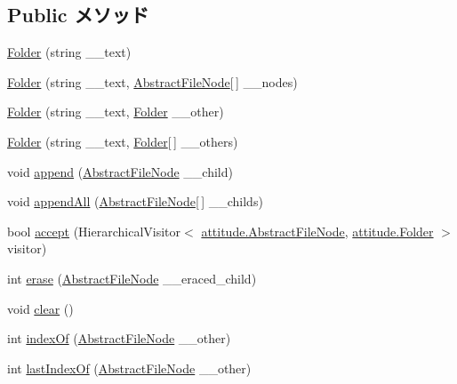 \subsection*{Public メソッド}
\begin{DoxyCompactItemize}
\item 
\hyperlink{classlazurite_1_1attitude_1_1_folder_a2f719c608e0aa3b6d36c40d31b167e79}{Folder} (string \_\-\_\-text)
\item 
\hyperlink{classlazurite_1_1attitude_1_1_folder_a5a7781a599e70e8c137cede1357b5ea1}{Folder} (string \_\-\_\-text, \hyperlink{classlazurite_1_1attitude_1_1_abstract_file_node}{AbstractFileNode}\mbox{[}$\,$\mbox{]} \_\-\_\-nodes)
\item 
\hyperlink{classlazurite_1_1attitude_1_1_folder_a06d32f03805baad6c1801dcb1985dea4}{Folder} (string \_\-\_\-text, \hyperlink{classlazurite_1_1attitude_1_1_folder}{Folder} \_\-\_\-other)
\item 
\hyperlink{classlazurite_1_1attitude_1_1_folder_a969647ad9d017d51b39728e301edb718}{Folder} (string \_\-\_\-text, \hyperlink{classlazurite_1_1attitude_1_1_folder}{Folder}\mbox{[}$\,$\mbox{]} \_\-\_\-others)
\item 
void \hyperlink{classlazurite_1_1attitude_1_1_folder_a2d16b4f30cbb594952277aeeee0c753b}{append} (\hyperlink{classlazurite_1_1attitude_1_1_abstract_file_node}{AbstractFileNode} \_\-\_\-child)
\item 
void \hyperlink{classlazurite_1_1attitude_1_1_folder_aae7705d67896ad15ad4be9d86b865d9e}{appendAll} (\hyperlink{classlazurite_1_1attitude_1_1_abstract_file_node}{AbstractFileNode}\mbox{[}$\,$\mbox{]} \_\-\_\-childs)
\item 
bool \hyperlink{classlazurite_1_1attitude_1_1_folder_ade81cb2a61c31230f4436781a7882e7a}{accept} (HierarchicalVisitor$<$ \hyperlink{classlazurite_1_1attitude_1_1_abstract_file_node}{attitude.AbstractFileNode}, \hyperlink{classlazurite_1_1attitude_1_1_folder}{attitude.Folder} $>$ visitor)
\item 
int \hyperlink{classlazurite_1_1attitude_1_1_folder_a49d1fc292192cb1d688c0e6a9ec0cb9b}{erase} (\hyperlink{classlazurite_1_1attitude_1_1_abstract_file_node}{AbstractFileNode} \_\-\_\-eraced\_\-child)
\item 
void \hyperlink{classlazurite_1_1attitude_1_1_folder_abdf37e15da03cd3b6507f445f115ff30}{clear} ()
\item 
int \hyperlink{classlazurite_1_1attitude_1_1_folder_a21d564936cd21a6e23d02bfb135b76f8}{indexOf} (\hyperlink{classlazurite_1_1attitude_1_1_abstract_file_node}{AbstractFileNode} \_\-\_\-other)
\item 
int \hyperlink{classlazurite_1_1attitude_1_1_folder_a0e18e28b51cf9d6135f8aa85765b8779}{lastIndexOf} (\hyperlink{classlazurite_1_1attitude_1_1_abstract_file_node}{AbstractFileNode} \_\-\_\-other)
\end{DoxyCompactItemize}
